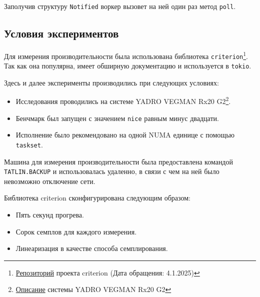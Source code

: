 Заполучив структуру \verb|Notified| воркер вызовет на ней один раз метод \verb|poll|.

\subsection{Условия экспериментов}

Для измерения производительности была использована библиотека \verb|criterion|\footnote{\href{https://github.com/bheisler/criterion.rs}{Репозиторий} проекта criterion (Дата обращения: 4.1.2025)}. Так как она популярна, имеет обширную документацию и используется в \verb|tokio|.

Здесь и далее эксперименты производились при следующих условиях:

\begin{itemize}
    \item Исследования проводились на системе YADRO VEGMAN Rx20 G2\footnote{\href{https://yadro.com/ru/vegman/rx20g2/specs}{Описание} системы YADRO VEGMAN Rx20 G2}.
    \item Бенчмарк был запущен с значением \verb|nice| равным минус двадцати.
    \item Исполнение было рекомендовано на одной NUMA единице с помощью \verb|taskset|.
\end{itemize}

Машина для измерения производительности была предоставлена командой \verb|TATLIN.BACKUP| и использовалась удаленно, в связи с чем на ней было невозможно отключение сети.

Библиотека criterion сконфигурирована следующим образом:

\begin{itemize}
    \item Пять секунд прогрева.
    \item Сорок семплов для каждого измерения.
    \item Линеаризация в качестве способа семплирования.
\end{itemize}
